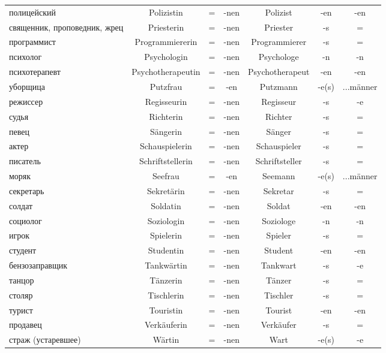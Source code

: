 \begin{longtable}{|p{4cm}|c|c|c|c|c|c|}
 полицейский & Polizistin & = & -nen & Polizist & -en & -en \\
 священник, проповедник, жрец & Priesterin & = & -nen & Priester & -s & = \\
 программист & Programmiererin & = & -nen & Programmierer & -s & = \\
 психолог & Psychologin & = & -nen & Psychologe & -n & -n \\
 психотерапевт & Psychotherapeutin & = & -nen & Psychotherapeut & -en & -en \\
 уборщица & Putzfrau & = & -en & Putzmann & -e(s) & ...m\"anner \\
 режиссер & Regisseurin & = & -nen & Regisseur & -s & -e \\
 судья & Richterin & = & -nen & Richter & -s & = \\
 певец & S\"angerin & = & -nen & S\"anger & -s & = \\
 актер & Schauspielerin & = & -nen & Schauspieler & -s & = \\
 писатель & Schriftstellerin & = & -nen & Schriftsteller & -s & = \\
 моряк & Seefrau & = & -en & Seemann & -e(s) & ...m\"anner \\
 секретарь & Sekret\"arin & = & -nen & Sekretar & -s & = \\
 солдат & Soldatin & = & -nen & Soldat & -en & -en \\
 социолог & Soziologin & = & -nen & Soziologe & -n & -n \\
 игрок & Spielerin & = & -nen & Spieler & -s & = \\
 студент & Studentin & = & -nen & Student & -en & -en \\
 бензозаправщик & Tankw\"artin & = & -nen & Tankwart & -s & -e \\
 танцор & T\"anzerin & = & -nen & T\"anzer & -s & = \\
 столяр & Tischlerin & = & -nen & Tischler & -s & = \\
 турист & Touristin & = & -nen & Tourist & -en & -en \\
 продавец & Verk\"auferin & = & -nen & Verk\"aufer & -s & = \\
 страж (устаревшее) & W\"artin & = & -nen & Wart & -e(s) & -e \\
\hline
\end{longtable}
